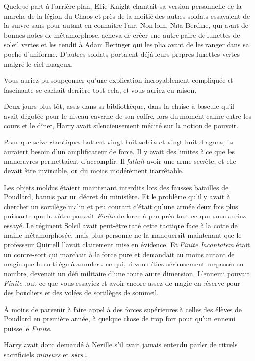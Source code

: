 Quelque part à l'arrière-plan, Ellie Knight chantait sa version personnelle de la marche de la légion du Chaos et près de la moitié des autres soldats essayaient de la suivre sans pour autant en connaître l'air. Non loin, Nita Berdine, qui avait de bonnes notes de métamorphose, acheva de créer une autre paire de lunettes de soleil vertes et les tendit à Adam Beringer qui les plia avant de les ranger dans sa poche d'uniforme. D'autres soldats portaient déjà leurs propres lunettes vertes malgré le ciel nuageux.

Vous auriez pu soupçonner qu'une explication incroyablement compliquée et fascinante se cachait derrière tout cela, et vous auriez eu raison.

Deux jours plus tôt, assis dans sa bibliothèque, dans la chaise à bascule qu'il avait dégotée pour le niveau caverne de son coffre, lors du moment calme entre les cours et le dîner, Harry avait silencieusement médité sur la notion de pouvoir.

Pour que seize chaotiques battent vingt-huit soleils et vingt-huit dragons, ils auraient besoin d'un amplificateur de force. Il y avait des limites à ce que les manœuvres permettaient d'accomplir. Il \emph{fallait} avoir une arme secrète, et elle devait être invincible, ou du moins modérément inarrêtable.

Les objets moldus étaient maintenant interdits lors des fausses batailles de Poudlard, bannis par un décret du ministère. Et le problème qu'il y avait à chercher un sortilège malin et peu courant c'était qu'une armée deux fois plus puissante que la vôtre pouvait \emph{Finite} de force à peu près tout ce que vous auriez essayé. Le régiment Soleil avait peut-être raté cette tactique face à la cotte de maille métamorphosée, mais plus personne ne la manquerait maintenant que le professeur Quirrell l'avait clairement mise en évidence. Et \emph{Finite Incantatem} était un contre-sort qui marchait à la force pure et demandait au moins autant de magie que le sortilège à annuler… ce qui, si vous étiez sérieusement surpassés en nombre, devenait un défi militaire d'une toute autre dimension. L'ennemi pouvait \emph{Finite} tout ce que vous essayiez et avoir encore assez de magie en réserve pour des boucliers et des volées de sortilèges de sommeil.

À moins de parvenir à faire appel à des forces supérieures à celles des élèves de Poudlard en première année, à quelque chose de trop fort pour qu'un ennemi puisse le \emph{Finite}.

Harry avait donc demandé à Neville s'il avait jamais entendu parler de rituels sacrificiels \emph{mineurs} et \emph{sûrs}…

